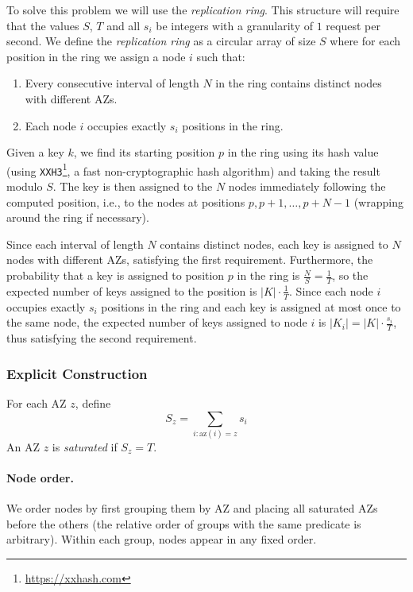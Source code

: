 To solve this problem we will use the \emph{replication ring}.
This structure will require that the values $S$, $T$ and all $s_i$ be integers
with a granularity of $1$ request per second.
We define the \emph{replication ring} as a circular array of size $S$ where for
each position in the ring we assign a node $i$ such that:

\begin{enumerate}
    \item Every consecutive interval of length $N$ in the ring contains
        distinct nodes with different AZs.
    \item Each node $i$ occupies exactly $s_i$ positions in the ring.
\end{enumerate}

Given a key $k$, we find its starting position $p$ in the ring using its hash
value (using \texttt{XXH3}\footnote{\url{https://xxhash.com}}, a fast
non-cryptographic hash algorithm) and taking the result modulo $S$.
The key is then assigned to the $N$ nodes immediately following the
computed position, i.e., to the nodes at positions $p, p + 1, \dots, p + N - 1$
(wrapping around the ring if necessary).

Since each interval of length $N$ contains distinct nodes, each key is assigned
to $N$ nodes with different AZs, satisfying the first requirement.
Furthermore, the probability that a key is assigned to position $p$ in the ring
is $\frac{N}{S} = \frac{1}{T}$, so the expected number of keys assigned to the
position is $|K| \cdot \frac{1}{T}$.
Since each node $i$ occupies exactly $s_i$ positions in the ring and each key
is assigned at most once to the same node, the expected number of keys assigned
to node $i$ is $|K_i| = |K| \cdot \frac{s_i}{T}$, thus satisfying the second
requirement.

\subsubsection{Explicit Construction}
\label{subsubsec:explicit-construction}

For each AZ $z$, define
\[
    S_z = \sum_{i : \mathrm{az}(i) = z} s_i
\]
An AZ $z$ is \emph{saturated} if $S_z = T$.

\paragraph{Node order.}
We order nodes by first grouping them by AZ and placing all saturated AZs
before the others (the relative order of groups with the same predicate is
arbitrary).
Within each group, nodes appear in any fixed order.

